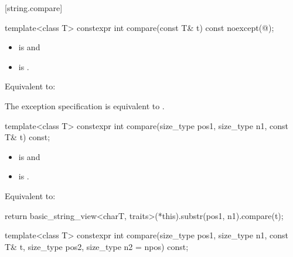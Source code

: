 [string.compare]{}

%
\begin{itemdecl}
template<class T>
  constexpr int compare(const T& t) const noexcept(@\seebelow@);
\end{itemdecl}

\begin{itemdescr}
\pnum
\constraints
\begin{itemize}
\item
{} is
 and
\item
{} is
.
\end{itemize}

\pnum
\effects
Equivalent to: 

\pnum
\remarks
The exception specification is equivalent to
.
\end{itemdescr}

%
\begin{itemdecl}
template<class T>
  constexpr int compare(size_type pos1, size_type n1, const T& t) const;
\end{itemdecl}

\begin{itemdescr}
\pnum
\constraints
\begin{itemize}
\item
{} is
 and
\item
{} is
.
\end{itemize}

\pnum
\effects
Equivalent to:
\begin{codeblock}
return basic_string_view<charT, traits>(*this).substr(pos1, n1).compare(t);
\end{codeblock}
\end{itemdescr}

%
\begin{itemdecl}
template<class T>
  constexpr int compare(size_type pos1, size_type n1, const T& t,
                        size_type pos2, size_type n2 = npos) const;
\end{itemdecl}

